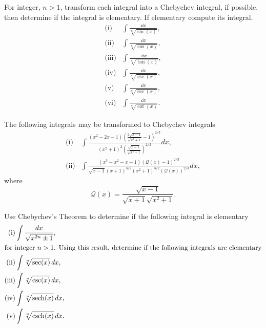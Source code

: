 For integer, $n > 1$, transform each integral into a Chebychev integral, if possible, then determine if the integral is elementary. If elementary compute its integral. 
\allowdisplaybreaks
\begin{align*}
\text{(i)} & \int \frac{\dd x}{\sqrt[n]{\sin(x)}}, \\
\text{(ii)} & \int \frac{\dd x}{\sqrt[n]{\cos(x)}}, \\
\text{(iii)} & \int \frac{\dd x}{\sqrt[n]{\tan(x)}}, \\
\text{(iv)} & \int \frac{\dd x}{\sqrt[n]{\csc(x)}}, \\
\text{(v)} & \int \frac{\dd x}{\sqrt[n]{\sec(x)}}, \\
\text{(vi)} & \int \frac{\dd x}{\sqrt[n]{\cot(x)}}.
\end{align*}

\medskip

The following integrals may be transformed to Chebychev integrals
\allowdisplaybreaks
\begin{align*}
\text{(i)} & \int \frac{\left(x^2-2 x-1\right) \left(\frac{2\sqrt{x-1}}{\sqrt{x^2+1}}-1\right)^{2/3}}{\left(x^2+1\right)^2 \left(\frac{\sqrt{x-1}}{\sqrt{x^2+1}}\right)^{2/3}} dx, \\
\text{(ii)} & \int \frac{\left(x^3-x^2-x-1\right) \left(\mathcal{Q}(x)-1\right)^{2/3}}{\sqrt{x-1} (x+1)^{3/2} \left(x^2+1\right)^{3/2} \left(\mathcal{Q}(x)\right)^{2/3}} dx,
\end{align*}
where $$\mathcal{Q}(x) = \frac{\sqrt{x-1}}{\sqrt{x+1} \sqrt{x^2+1}}.$$

\medskip

Use Chebychev's Theorem to determine if the following integral is elementary
\allowdisplaybreaks
\begin{align*}
\text{(i)} & \int \frac{dx}{\sqrt{x^{2n}\pm1}},\\
\intertext{for integer $n > 1$. Using this result, determine if the following integrals are elementary}
\text{(ii)} & \int \sqrt[n]{\sec(x)}\,dx, \\
\text{(iii)} & \int \sqrt[n]{\csc(x)}\,dx,\\
\text{(iv)} & \int \sqrt[n]{\text{sech}(x)}\,dx,\\
\text{(v)} & \int \sqrt[n]{\text{csch}(x)}\,dx.
\end{align*}


